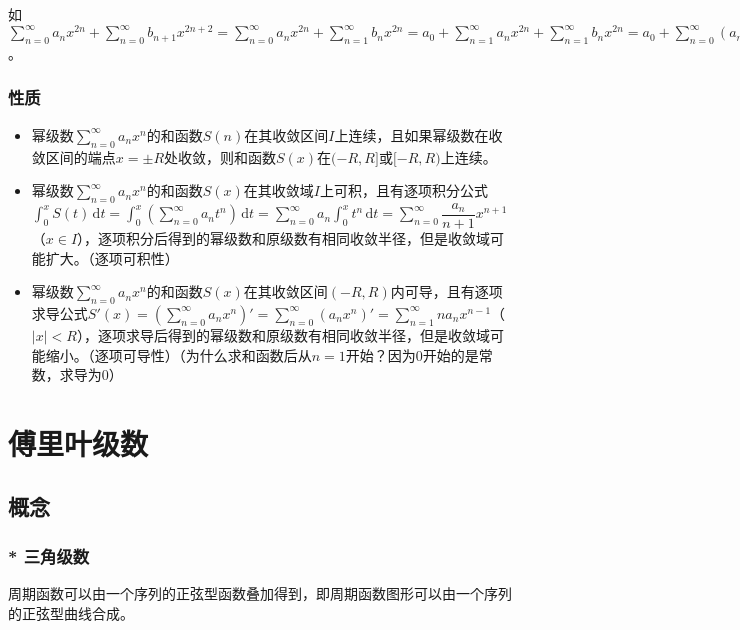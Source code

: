 \documentclass[UTF8, 12pt]{ctexart}
\begin{document}
        如$\sum\limits_{n=0}^\infty a_nx^{2n}+\sum\limits_{n=0}^\infty b_{n+1}x^{2n+2}=\sum\limits_{n=0}^\infty a_nx^{2n}+\sum\limits_{n=1}^\infty b_nx^{2n}=a_0+\sum\limits_{n=1}^\infty a_nx^{2n}+\sum\limits_{n=1}^\infty b_nx^{2n}=a_0+\sum\limits_{n=0}^\infty(a_n+b_n)x^{2n}$。

        \subsubsection{性质}

        \begin{itemize}
            \item 幂级数$\sum\limits_{n=0}^\infty a_nx^n$的和函数$S(n)$在其收敛区间$I$上连续，且如果幂级数在收敛区间的端点$x=\pm R$处收敛，则和函数$S(x)$在$(-R,R]$或$[-R,R)$上连续。
            \item 幂级数$\sum\limits_{n=0}^\infty a_nx^n$的和函数$S(x)$在其收敛域$I$上可积，且有逐项积分公式$\int_0^xS(t)\,\textrm{d}t=\int_0^x(\sum\limits_{n=0}^\infty a_nt^n)\,\textrm{d}t=\sum\limits_{n=0}^\infty a_n\int_0^xt^n\,\textrm{d}t=\sum\limits_{n=0}^\infty\dfrac{a_n}{n+1}x^{n+1}$（$x\in I$），逐项积分后得到的幂级数和原级数有相同收敛半径，但是收敛域可能扩大。（逐项可积性）
            \item 幂级数$\sum\limits_{n=0}^\infty a_nx^n$的和函数$S(x)$在其收敛区间$(-R,R)$内可导，且有逐项求导公式$S'(x)=(\sum\limits_{n=0}^\infty a_nx^n)'=\sum\limits_{n=0}^\infty(a_nx^n)'=\sum\limits_{n=1}^\infty na_nx^{n-1}$（$\vert x\vert<R$），逐项求导后得到的幂级数和原级数有相同收敛半径，但是收敛域可能缩小。（逐项可导性）（为什么求和函数后从$n=1$开始？因为0开始的是常数，求导为0）
        \end{itemize}

        \section{傅里叶级数}

        \subsection{概念}

        \subsubsection{* 三角级数}

        周期函数可以由一个序列的正弦型函数叠加得到，即周期函数图形可以由一个序列的正弦型曲线合成。
\end{document}

